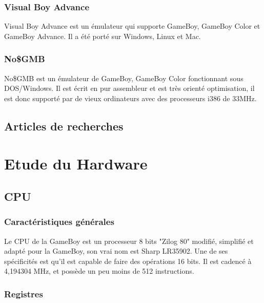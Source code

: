 \documentclass{report}
\begin{document}
\subsection{Visual Boy Advance}
Visual Boy Advance \cite{visualboyadv} est un émulateur qui supporte GameBoy, GameBoy Color et GameBoy Advance. Il a été porté sur Windows, Linux et Mac.
\subsection{No\$GMB}
No\$GMB \cite{nogmb} est un émulateur de GameBoy, GameBoy Color fonctionnant sous DOS/Windows. Il est écrit en pur assembleur et est très orienté optimisation, il est donc supporté par de vieux ordinateurs avec des processeurs i386 de 33MHz.
\section{Articles de recherches}

\chapter{Etude du Hardware}
\section{CPU}
\subsection{Caractéristiques générales}
Le CPU de la GameBoy est un processeur 8 bits "Zilog 80" modifié, simplifié et adapté pour la GameBoy, son vrai nom est Sharp LR35902.
Une de ses spécificités est qu'il est capable de faire des opérations 16 bits.
Il est cadencé à 4,194304 MHz, et possède un peu moins de 512 instructions.
\subsection{Registres}
\end{document}
